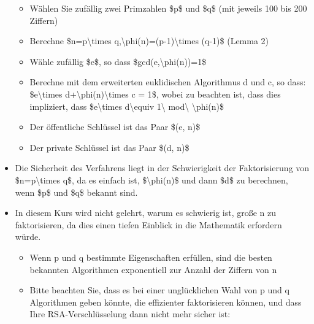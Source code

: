 \documentclass[a4paper]{article}
\begin{document}
\begin{multicols}{3}
\begin{itemize}
              \begin{itemize}
                  \item
                        Wählen Sie zufällig zwei Primzahlen \$p\$ und \$q\$ (mit jeweils 100
                        bis 200 Ziffern)
                  \item
                        Berechne \$n=p\textbackslash times
                        q,\textbackslash phi(n)=(p-1)\textbackslash times (q-1)\$ (Lemma 2)
                  \item
                        Wähle zufällig \$e\$, so dass \$gcd(e,\textbackslash phi(n))=1\$
                  \item
                        Berechne mit dem erweiterten euklidischen Algorithmus d und c, so
                        dass: \$e\textbackslash times
                        d+\textbackslash phi(n)\textbackslash times c = 1\$, wobei zu
                        beachten ist, dass dies impliziert, dass \$e\textbackslash times
                        d\textbackslash equiv 1\textbackslash{} mod\textbackslash{}
                        \textbackslash phi(n)\$
                  \item
                        Der öffentliche Schlüssel ist das Paar \$(e, n)\$
                  \item
                        Der private Schlüssel ist das Paar \$(d, n)\$
              \end{itemize}
        \item
              Die Sicherheit des Verfahrens liegt in der Schwierigkeit der
              Faktorisierung von \$n=p\textbackslash times q\$, da es einfach ist,
              \$\textbackslash phi(n)\$ und dann \$d\$ zu berechnen, wenn \$p\$ und
              \$q\$ bekannt sind.
        \item
              In diesem Kurs wird nicht gelehrt, warum es schwierig ist, große n zu
              faktorisieren, da dies einen tiefen Einblick in die Mathematik
              erfordern würde.

              \begin{itemize}
                  \item
                        Wenn p und q bestimmte Eigenschaften erfüllen, sind die besten
                        bekannten Algorithmen exponentiell zur Anzahl der Ziffern von n
                  \item
                        Bitte beachten Sie, dass es bei einer unglücklichen Wahl von p und q
                        Algorithmen geben könnte, die effizienter faktorisieren können, und
                        dass Ihre RSA-Verschlüsselung dann nicht mehr sicher ist:


\end{itemize}
\end{itemize}
\end{multicols}
\end{document}

